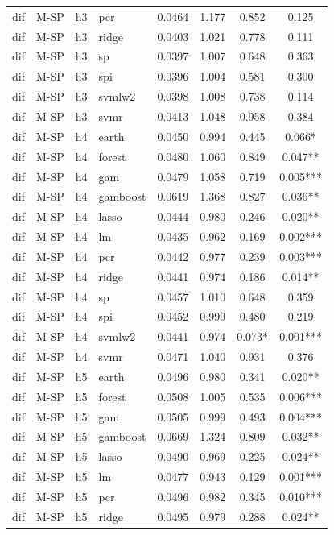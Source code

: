 \begin{ThreePartTable}
\begin{longtable}[t]{llclcccc}
dif & M-SP & h3 & pcr & 0.0464 & 1.177 & 0.852 & 0.125\\
dif & M-SP & h3 & ridge & 0.0403 & 1.021 & 0.778 & 0.111\\
dif & M-SP & h3 & sp & 0.0397 & 1.007 & 0.648 & 0.363\\
dif & M-SP & h3 & spi & 0.0396 & 1.004 & 0.581 & 0.300\\
dif & M-SP & h3 & svmlw2 & 0.0398 & 1.008 & 0.738 & 0.114\\
dif & M-SP & h3 & svmr & 0.0413 & 1.048 & 0.958 & 0.384\\
\addlinespace
dif & M-SP & h4 & earth & 0.0450 & 0.994 & 0.445 & 0.066*\\
dif & M-SP & h4 & forest & 0.0480 & 1.060 & 0.849 & 0.047**\\
dif & M-SP & h4 & gam & 0.0479 & 1.058 & 0.719 & 0.005***\\
dif & M-SP & h4 & gamboost & 0.0619 & 1.368 & 0.827 & 0.036**\\
dif & M-SP & h4 & lasso & 0.0444 & 0.980 & 0.246 & 0.020**\\
dif & M-SP & h4 & lm & 0.0435 & 0.962 & 0.169 & 0.002***\\
dif & M-SP & h4 & pcr & 0.0442 & 0.977 & 0.239 & 0.003***\\
dif & M-SP & h4 & ridge & 0.0441 & 0.974 & 0.186 & 0.014**\\
dif & M-SP & h4 & sp & 0.0457 & 1.010 & 0.648 & 0.359\\
dif & M-SP & h4 & spi & 0.0452 & 0.999 & 0.480 & 0.219\\
dif & M-SP & h4 & svmlw2 & 0.0441 & 0.974 & 0.073* & 0.001***\\
dif & M-SP & h4 & svmr & 0.0471 & 1.040 & 0.931 & 0.376\\
\addlinespace
dif & M-SP & h5 & earth & 0.0496 & 0.980 & 0.341 & 0.020**\\
dif & M-SP & h5 & forest & 0.0508 & 1.005 & 0.535 & 0.006***\\
dif & M-SP & h5 & gam & 0.0505 & 0.999 & 0.493 & 0.004***\\
dif & M-SP & h5 & gamboost & 0.0669 & 1.324 & 0.809 & 0.032**\\
dif & M-SP & h5 & lasso & 0.0490 & 0.969 & 0.225 & 0.024**\\
dif & M-SP & h5 & lm & 0.0477 & 0.943 & 0.129 & 0.001***\\
dif & M-SP & h5 & pcr & 0.0496 & 0.982 & 0.345 & 0.010***\\
dif & M-SP & h5 & ridge & 0.0495 & 0.979 & 0.288 & 0.024**\\

\end{longtable}
\end{ThreePartTable}

